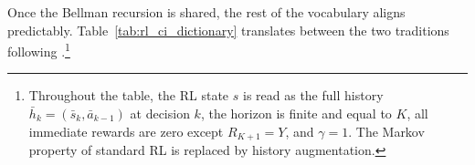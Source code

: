 \begin{table}[htbp]
\centering
\caption{Recovered policy value $V(\hat\pi) / V^*$ at the largest cohort size on the synthetic two-stage DTR (rank-ordered by performance). Tabular setting: $N = 10{,}000$ subjects, 50 Monte Carlo seeds, paired across the two estimators. High-dimensional setting: $p = 10$ continuous state, $N = 5{,}000$, 20 Monte Carlo seeds, paired across the two estimators.}
\label{tab:dtr_qlearning_vs_murphy}

\end{table}

Once the Bellman recursion is shared, the rest of the vocabulary aligns predictably. Table~\ref{tab:rl_ci_dictionary} translates between the two traditions following \citet{schulte2014qlearning}.\footnote{Throughout the table, the RL state $s$ is read as the full history $\bar h_k = (\bar s_k, \bar a_{k-1})$ at decision $k$, the horizon is finite and equal to $K$, all immediate rewards are zero except $R_{K+1} = Y$, and $\gamma = 1$. The Markov property of standard RL is replaced by history augmentation.}


